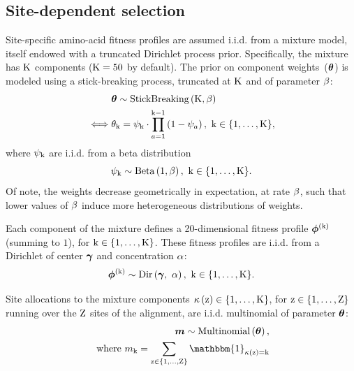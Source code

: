 \documentclass{article}
\begin{document}
    \subsection{Site-dependent selection}
    \label{sec:profiles}
    Site-specific amino-acid fitness profiles are assumed i.i.d. from a mixture model, itself endowed with a truncated Dirichlet process prior.
    Specifically, the mixture has $\text{K}$ components ($\text{K} = 50$ by default).
    The prior on component weights~($\bm{\theta}$) is modeled using a stick-breaking process, truncated at $\text{K}$ and of parameter $\beta$:
    \begin{align}
        \label{eq:DistribStickBreaking}
        \begin{split}
            & \bm{\theta} \sim \text{StickBreaking}\left( \text{K}, \beta \right)\\
            \iff & \theta_{\text{k}} = \psi_{\text{k}}\cdot \prod _{{a=1}}^{{\text{k}-1}}\left(1-\psi_{a}\right),\ \text{k} \in \{1, \hdots, \text{K}\},
        \end{split}
    \end{align}
    where $\psi_{\text{k}}$ are i.i.d. from a beta distribution
    \begin{equation}
        \label{eq:Beta}
        \psi_{\text{k}} \sim \text{Beta}\left( 1, \beta \right),\ \text{k} \in \{1, \hdots, \text{K}\}.
    \end{equation}
    Of note, the weights decrease geometrically in expectation, at rate $\beta$, such that lower values of $\beta$ induce more heterogeneous distributions of weights.

    Each component of the mixture defines a 20-dimensional fitness profile $\bm{\phi}^{(\text{k})}$ (summing to $1$), for $ \text{k} \in \{1, \hdots, \text{K}\}$.
    These fitness profiles are i.i.d. from a Dirichlet of center $\bm{\gamma}$ and concentration $\alpha$:
    \begin{equation}
        \label{eq:DistribBase}
        \Profile\catexp \sim \text{Dir}\left( \centerProfile,\ \concentrationProfile \right),\ \Setcat.
    \end{equation}

    Site allocations to the mixture components $\kappa\left(\text{z}\right) \in \{1, \hdots, \text{K}\} $, for $\text{z} \in \{1, \hdots, \text{Z}\}$ running over the $\text{Z}$ sites of the alignment, are i.i.d. multinomial of parameter $\bm{\theta}$:
    \begin{align}
        \label{eq:DistribMultinomial}
        \catMultiVar \sim \text{Multinomial}\left( \StickBreaking \right), \\
        \text{ where } \catmultivar_{\cat} = \sum_{\Setsite} \mathbbm{1}_{\catsite = \cat}
    \end{align}
\end{document}

